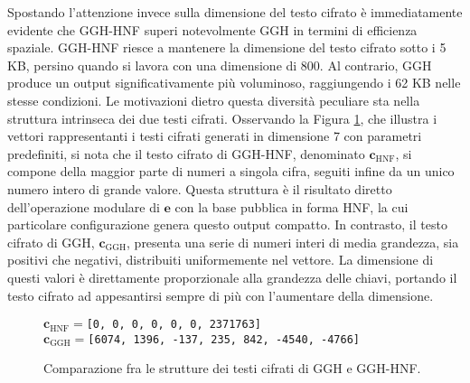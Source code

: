 Spostando l'attenzione invece sulla dimensione del testo cifrato è immediatamente evidente 
che GGH-HNF superi notevolmente GGH in termini di efficienza spaziale.
GGH-HNF riesce a mantenere la dimensione del testo cifrato sotto i 5 KB, persino quando 
si lavora con una dimensione di 800. Al contrario, GGH produce un output significativamente 
più voluminoso, raggiungendo i 62 KB nelle stesse condizioni. 
Le motivazioni dietro questa diversità peculiare sta nella struttura intrinseca dei due 
testi cifrati. Osservando la Figura \ref{fig:ciphertexts_comparation}, che illustra i vettori 
rappresentanti i testi cifrati generati in dimensione 7 con parametri predefiniti, si nota che il 
testo cifrato di GGH-HNF, denominato $\mathbf{c}_{\text{HNF}}$, si compone della
maggior parte di numeri a singola cifra, 
seguiti infine da un unico numero intero di grande valore. Questa struttura è il risultato 
diretto dell'operazione modulare di $\mathbf{e}$ con la base pubblica in forma HNF, 
la cui particolare configurazione genera questo output compatto. In contrasto, 
il testo cifrato di GGH, $\mathbf{c}_{\text{GGH}}$, presenta una serie di numeri 
interi di media grandezza, sia positivi che negativi, distribuiti uniformemente 
nel vettore. La dimensione di questi valori è direttamente proporzionale alla grandezza
delle chiavi, portando il testo cifrato ad appesantirsi sempre di più con l'aumentare 
della dimensione. 

\begin{figure}[h!]
    \centering
    \texttt{$\mathbf{c}_{\text{HNF}} = $[0, 0, 0, 0, 0, 0, 2371763]}\\
    \texttt{$\mathbf{c}_{\text{GGH}} = $[6074, 1396, -137, 235, 842, -4540, -4766]}
    \caption{Comparazione fra le strutture dei testi cifrati di GGH e GGH-HNF.}
    \label{fig:ciphertexts_comparation}
\end{figure}

